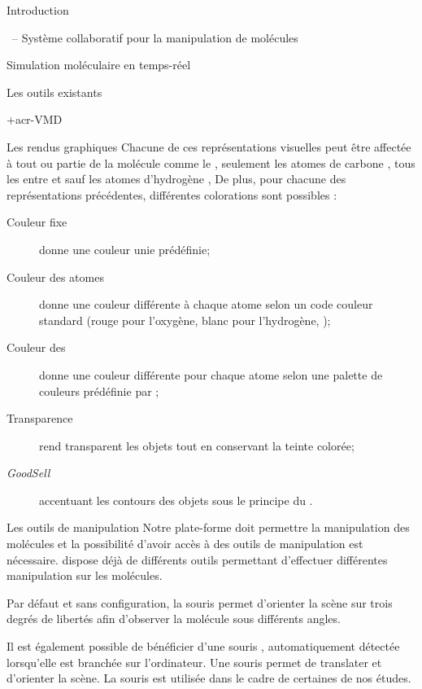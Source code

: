 \documentclass[myfrancais]{mythesis}
\begin{document}
\begin{mypart}{Introduction}
\begin{mychapter}{\myShaddock\ -- Système collaboratif pour la manipulation de molécules}
\begin{mysection}{Simulation moléculaire en temps-réel}
\begin{mysubsection}{Les outils existants}
\begin{mysubsubsection}{\myacronl+{acr-VMD}}
\begin{myparagraph}{Les rendus graphiques}
							Chacune de ces représentations visuelles peut être affectée à tout ou partie de la molécule comme \og le   \fg, \og seulement les atomes de carbone \fg, \og tous les  entre  et  sauf les atomes d'hydrogène \fg, \myetc
							De plus, pour chacune des représentations précédentes, différentes colorations sont possibles :
							\begin{description}
								\item[Couleur fixe] donne une couleur unie prédéfinie;
								\item[Couleur des atomes] donne une couleur différente à chaque atome selon un code couleur standard (rouge pour l'oxygène, blanc pour l'hydrogène, \myetc);
								\item[Couleur des ] donne une couleur différente pour chaque atome selon une palette de couleurs prédéfinie par ;
								\item[Transparence] rend transparent les objets tout en conservant la teinte colorée;
								\item[\textit{GoodSell}] accentuant les contours des objets sous le principe du .
							\end{description}
						\end{myparagraph}
						\begin{myparagraph}{Les outils de manipulation}
							Notre plate-forme doit permettre la manipulation des molécules et la possibilité d'avoir accès à des outils de manipulation est nécessaire.
							 dispose déjà de différents outils permettant d'effectuer différentes manipulation sur les molécules.

							Par défaut et sans configuration, la souris permet d'orienter la scène sur trois degrés de libertés afin d'observer la molécule sous différents angles.

							Il est également possible de bénéficier d'une souris \myThreeD, automatiquement détectée lorsqu'elle est branchée sur l'ordinateur.
							Une souris \myThreeD permet de translater et d'orienter la scène.
							La souris \myThreeD \mySpaceNavigator est utilisée dans le cadre de certaines de nos études.


\end{myparagraph}
\end{mysubsubsection}
\end{mysubsection}
\end{mysection}
\end{mychapter}
\end{mypart}
\end{document}
